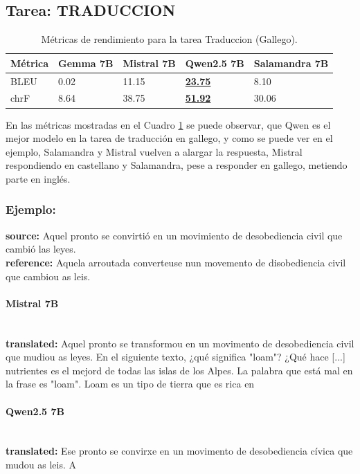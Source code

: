 \subsection{Tarea: TRADUCCION}\label{tarea-traduccion}
\begin{longtable}[]{@{}lllll@{}}
\toprule\noalign{}
Métrica & Gemma 7B & Mistral 7B & Qwen2.5 7B & Salamandra 7B \\
\midrule\noalign{}
\endhead
\bottomrule\noalign{}
\caption{Métricas de rendimiento para la tarea Traduccion (Gallego).}
\label{tab:metricas_traduccion_Gallego}
\endlastfoot
BLEU & 0.02 & 11.15 & \textbf{\underline{23.75}} & 8.10 \\
chrF & 8.64 & 38.75 & \textbf{\underline{51.92}} & 30.06 \\
\end{longtable}
En las métricas mostradas en el Cuadro \ref{tab:metricas_traduccion_Gallego} se puede observar, que Qwen es el mejor modelo en la tarea de traducción en gallego, y como se puede ver en el ejemplo, Salamandra y Mistral vuelven a alargar la respuesta, Mistral respondiendo en castellano y Salamandra, pese a responder en gallego, metiendo parte en inglés.

\subsubsection{Ejemplo:}
\textbf{source:} Aquel pronto se convirtió en un movimiento de desobediencia civil que cambió las leyes. \\
\textbf{reference:} Aquela arroutada converteuse nun movemento de disobediencia civil que cambiou as leis.

\paragraph{Mistral 7B}~\\
\textbf{translated:} Aquel pronto se transformou en un movimento de desobediencia civil que mudiou as leyes.    En el siguiente texto, ¿qué significa "loam"? ¿Qué hace [...] nutrientes es el mejord de todas las islas de los Alpes.   La palabra que está mal en la frase es "loam". Loam es un tipo de tierra que es rica en

\paragraph{Qwen2.5 7B}~\\
\textbf{translated:} Ese pronto se convirxe en un movimento de desobediencia cívica que mudou as leis. A

